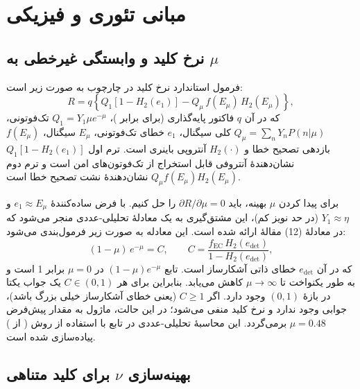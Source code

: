 \section{مبانی تئوری و فیزیکی}

\subsection{نرخ کلید  و وابستگی غیرخطی به $\mu$}

فرمول استاندارد نرخ کلید در چارچوب  به صورت زیر است:
\begin{equation}
	R = q\left\{Q_1\left[1 - H_2(e_1)\right] - Q_\mu\,f(E_\mu)\,H_2(E_\mu)\right\},
\end{equation}
که در آن $q$ فاکتور پایه‌گذاری (برای  برابر )، $Q_1 = Y_1 \mu e^{-\mu}$  تک‌فوتونی، $Q_\mu = \sum_n Y_n P(n|\mu)$  کلی سیگنال، $e_1$ خطای تک‌فوتونی، $E_\mu$  سیگنال، $f(E_\mu)$ بازدهی تصحیح خطا و $H_2(\cdot)$ آنتروپی باینری است. ترم اول $Q_1[1 - H_2(e_1)]$ نشان‌دهندۀ آنتروفی قابل استخراج از تک‌فوتون‌های امن است و ترم دوم $Q_\mu f(E_\mu) H_2(E_\mu)$ نشان‌دهندۀ نشت تصحیح خطا است. 

برای پیدا کردن $\mu$ بهینه، باید $\partial R / \partial \mu = 0$ را حل کنیم. با فرض ساده‌کنندۀ $e_1 \approx E_\mu$ و $Y_1 \approx \eta$ (در حد نویز کم)، این مشتق‌گیری به یک معادلۀ تحلیلی-عددی منجر می‌شود که در معادلۀ (12) مقالۀ  ارائه شده است. این معادله به صورت زیر فرمول‌بندی می‌شود:
\begin{equation}
	(1 - \mu)\,e^{-\mu} = C, \qquad C = \frac{f_{\text{EC}}\,H_2(e_{\text{det}})}{1 - H_2(e_{\text{det}})},
\end{equation}
که در آن $e_{\text{det}}$ خطای ذاتی آشکارساز است. تابع $(1-\mu)e^{-\mu}$ در $\mu = 0$ برابر 1 است و به طور یکنواخت تا $\mu \to \infty$ کاهش می‌یابد. بنابراین برای هر $C \in (0, 1)$ یک جواب یکتا در بازۀ $(0, 1)$ وجود دارد. اگر $C \ge 1$ (یعنی خطای آشکارساز خیلی بزرگ باشد)، جوابی وجود ندارد و نرخ کلید منفی می‌شود؛ در این حالت، ماژول به مقدار پیش‌فرض $\mu = 0.48$ برمی‌گردد. این محاسبۀ تحلیلی-عددی در تابع  با استفاده از روش  ( از ) پیاده‌سازی شده است.

\subsection{بهینه‌سازی $\nu$ برای کلید متناهی}

